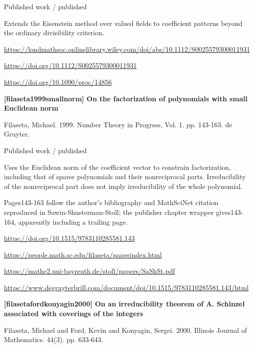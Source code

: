 \documentclass[11pt,a4paper,oneside,openany]{book}
\begin{document}
{\small\sffamily\color{atlasgold}Published work / published}\par
\color{black} Extends the Eisenstein method over valued fields to coefficient patterns beyond the ordinary divisibility criterion.\par
{\footnotesize\url{https://londmathsoc.onlinelibrary.wiley.com/doi/abs/10.1112/S0025579300011931}}\par
{\footnotesize\url{https://doi.org/10.1112/S0025579300011931}}\par
{\footnotesize\url{https://doi.org/10.1090/proc/14856}}\par
\vspace{9pt}
\hypertarget{ref:filaseta1999smallnorm}{}
{\sffamily\bfseries\color{atlasgreen}[filaseta1999smallnorm] On the factorization of polynomials with small Euclidean norm}\par
\color{black} Filaseta, Michael. 1999. Number Theory in Progress, Vol. 1. pp. 143-163. de Gruyter.\par
{\small\sffamily\color{atlasgold}Published work / published}\par
\color{black} Uses the Euclidean norm of the coefficient vector to constrain factorization, including that of sparse polynomials and their nonreciprocal parts. Irreducibility of the nonreciprocal part does not imply irreducibility of the whole polynomial.\par
{\small Pages143-163 follow the author's bibliography and MathSciNet citation reproduced in Sawin-Shusterman-Stoll; the publisher chapter wrapper gives143-164, apparently including a trailing page.}\par
{\footnotesize\url{https://doi.org/10.1515/9783110285581.143}}\par
{\footnotesize\url{https://people.math.sc.edu/filaseta/paperindex.html}}\par
{\footnotesize\url{https://mathe2.uni-bayreuth.de/stoll/papers/SaShSt.pdf}}\par
{\footnotesize\url{https://www.degruyterbrill.com/document/doi/10.1515/9783110285581.143/html}}\par
\vspace{9pt}
\hypertarget{ref:filasetafordkonyagin2000}{}
{\sffamily\bfseries\color{atlasgreen}[filasetafordkonyagin2000] On an irreducibility theorem of A. Schinzel associated with coverings of the integers}\par
\color{black} Filaseta, Michael and Ford, Kevin and Konyagin, Sergei. 2000. Illinois Journal of Mathematics. 44(3). pp. 633-643.\par
\end{document}

